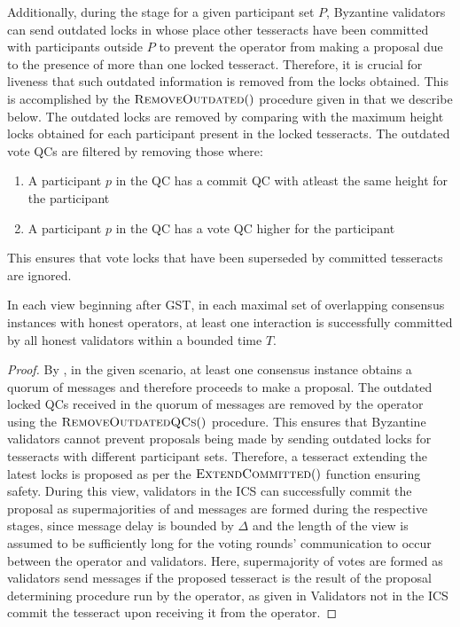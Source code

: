 Additionally, during the  stage for a given participant set $P$, Byzantine validators can send outdated  locks in whose place other tesseracts have been committed with participants outside $P$ to prevent the operator from making a proposal due to the presence of more than one  locked tesseract. 
Therefore, it is crucial for liveness that such outdated information is removed from the locks obtained. 
This is accomplished by the $\mathrm{\textsc{RemoveOutdated}}()$ procedure given in  that we describe below.
The outdated locks are removed by comparing with the maximum height locks obtained for each participant present in the locked tesseracts. 
The outdated vote QCs are filtered by removing those where:
     \begin{enumerate}
         \item A participant $p$ in the QC has a commit QC with atleast the same height for the participant
         \item A participant $p$ in the QC has a vote QC higher for the participant
     \end{enumerate}
This ensures that vote locks that have been superseded by committed tesseracts are ignored.

\begin{theorem} 
    In each view beginning after GST, in each maximal set of overlapping consensus instances with honest operators, at least one interaction is successfully committed by all honest validators within a bounded time $T$.
\end{theorem}
\begin{proof}
    By , in the given scenario, at least one consensus instance obtains a quorum of  messages and therefore proceeds to make a proposal. 
    The outdated locked QCs received in the quorum of  messages are removed by the operator using the $\mathrm{\textsc{RemoveOutdatedQCs}}()$ procedure.
    This ensures that Byzantine validators cannot prevent proposals being made by sending outdated locks for tesseracts with different participant sets.
    Therefore, a tesseract extending the latest locks is proposed as per the $\mathrm{\textsc{ExtendCommitted}}()$ function ensuring safety. 
    During this view, validators in the ICS can successfully commit the proposal as supermajorities of  and  messages are formed during the respective stages, since message delay is bounded by $\Delta$ and the length of the view is assumed to be sufficiently long for the voting rounds' communication to occur between the operator and validators. 
    Here, supermajority of votes are formed as validators send  messages if the proposed tesseract is the result of the proposal determining procedure run by the operator, as given in 
        Validators not in the ICS commit the tesseract upon receiving it from the operator.
\end{proof}

